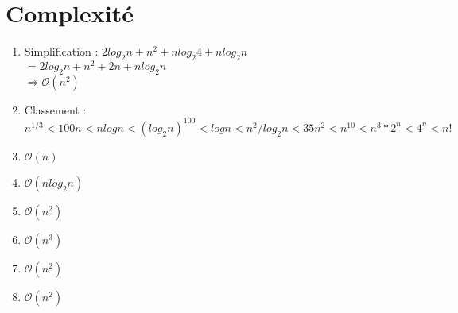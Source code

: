 \documentclass[11pt]{article}
\begin{document}
\section{Complexité}
\begin{enumerate}
	\item Simplification : $2 log_2n + n^2 + n log_2 4 + n log_2 n$\\$= 2 log_2 n + n^2 + 2n + n log_2n$\\$\Rightarrow \mathcal{O}(n^2)$
	\item Classement : $n^{1/3} < 100n < n log n < (log_2 n)^{100} < log n < n^2 / log_2 n < 35n^2 < n^{10} < n^3 * 2^n < 4^n < n!$
	\item $\mathcal{O}(n)$
	\item $\mathcal{O}(n log_2 n)$
	\item $\mathcal{O}(n^2)$
	\item $\mathcal{O}(n^3)$
	\item $\mathcal{O}(n^2)$
	\item $\mathcal{O}(n^2)$
\end{enumerate} 
\end{document}
